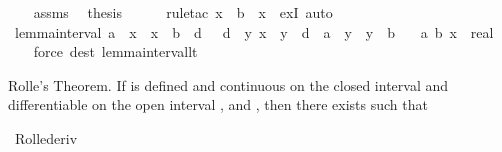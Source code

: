 \begin{isabellebody}
\ \ \isamarkupfalse%
\ assms\ \isamarkupfalse%
\ {\isacharquery}{\kern0pt}thesis\isanewline
\ \ \ \ \isamarkupfalse%
\ {\isacharparenleft}{\kern0pt}rule{\isacharunderscore}{\kern0pt}tac\ x\ {\isacharequal}{\kern0pt}\ {\isachardoublequoteopen}b\ {\isacharminus}{\kern0pt}\ x{\isachardoublequoteclose}\ \ exI{\isacharparenright}{\kern0pt}\ auto\isanewline
{}\isamarkupfalse%
%
\endisatagproof
{\isafoldproof}%
%
\isadelimproof
\isanewline
%
\endisadelimproof
\isanewline
{}\isamarkupfalse%
\ lemma{\isacharunderscore}{\kern0pt}interval{\isacharcolon}{\kern0pt}\ {\isachardoublequoteopen}a\ {\isacharless}{\kern0pt}\ x\ {\isasymLongrightarrow}\ x\ {\isacharless}{\kern0pt}\ b\ {\isasymLongrightarrow}\ {\isasymexists}d{\isachardot}{\kern0pt}\ {}\ {\isacharless}{\kern0pt}\ d\ {\isasymand}\ {\isacharparenleft}{\kern0pt}{\isasymforall}y{\isachardot}{\kern0pt}\ {\isasymbar}x\ {\isacharminus}{\kern0pt}\ y{\isasymbar}\ {\isacharless}{\kern0pt}\ d\ {\isasymlongrightarrow}\ a\ {\isasymle}\ y\ {\isasymand}\ y\ {\isasymle}\ b{\isacharparenright}{\kern0pt}{\isachardoublequoteclose}\isanewline
\ \ \ a\ b\ x\ {\isacharcolon}{\kern0pt}{\isacharcolon}{\kern0pt}\ real\isanewline
%
\isadelimproof
\ \ %
\endisadelimproof
%
\isatagproof
{}\isamarkupfalse%
\ {\isacharparenleft}{\kern0pt}force\ dest{\isacharcolon}{\kern0pt}\ lemma{\isacharunderscore}{\kern0pt}interval{\isacharunderscore}{\kern0pt}lt{\isacharparenright}{\kern0pt}%
\endisatagproof
{\isafoldproof}%
%
\isadelimproof
%
\endisadelimproof
%
\begin{isamarkuptext}%
Rolle's Theorem.
   If  is defined and continuous on the closed interval
    and differentiable on the open interval ,
   and ,
   then there exists  such that %
\end{isamarkuptext}\isamarkuptrue%
\isamarkupfalse%
\ Rolle{\isacharunderscore}{\kern0pt}deriv{\isacharcolon}{\kern0pt}\isanewline

\end{isabellebody}
